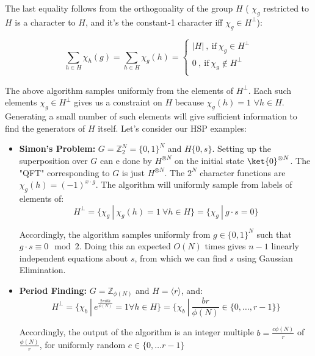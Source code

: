 The last equality follows from the orthogonality of the group $H$ ( $\chi_g$ restricted to $H$ is a character to $H$, and it's the constant-1 character iff $\chi_g \in H^\perp$):

\begin{equation*}
    \sum_{h \in H} \chi_h(g) = \sum_{h \in H} \chi_g(h) = \begin{cases}
    |H| \ , \ \text{if} \ \chi_g \in H^\perp \\
    0 \ , \ \text{if} \ \chi_g \not\in H^\perp \\
    \end{cases}
\end{equation*}

The above algorithm samples uniformly from the elements of $H^\perp$. Each such elements $\chi_g \in H^\perp$ gives us a constraint on $H$ because $\chi_g(h) = 1$ $\forall h \in H$. Generating a small number of such elements will give sufficient information to find the generators of $H$ itself. Let's consider our HSP examples:

\begin{itemize}
    \item \textbf{Simon's Problem:} $G = \mathbb{Z}_2^N = \{ 0, 1 \}^N$  and $H \{ 0, s\}$. Setting up the superposition over $G$ can e done by $H^{\otimes N}$ on the initial state $\ket{0}^{\otimes N}$. The "QFT" corresponding to $G$ is just $H^{\otimes N}$. The $2^N$ character functions are $\chi_g(h) = (-1)^{x \cdot g}$. The algorithm will uniformly sample from labels of elements of:
    \begin{equation*}
        H^\perp = \{ \chi_g \ | \ \chi_g(h) = 1 \ \forall h \in H \} = \{ \chi_g \ | \ g \cdot s = 0 \}
    \end{equation*}
    
    Accordingly, the algorithm samples uniformly from $g \in \{ 0,1 \}^N$ such that $g \cdot s \equiv 0 \mod 2$. Doing this an expected $O(N)$ times gives $n-1$ linearly independent equations about $s$, from which we can find $s$ using Gaussian Elimination.
    
    \item \textbf{Period Finding:} $G = \mathbb{Z}_{\phi(N)}$ and $H = \langle r \rangle $, and:
    \begin{equation*}
        H^\perp = \{ \chi_b \ | \ e^{\frac{2 \pi i b h }{\phi(N)}} = 1 \forall h \in H \} = \{ \chi_b \ | \ \frac{br}{\phi(N)} \in \{0, \dots, r-1 \} \}
    \end{equation*}
    
    Accordingly, the output of the algorithm is an integer multiple $b = \frac{c \phi(N)}{r}$ of $\frac{\phi(N)}{r}$, for uniformly random $c \in \{0, \dots r-1 \}$
\end{itemize}